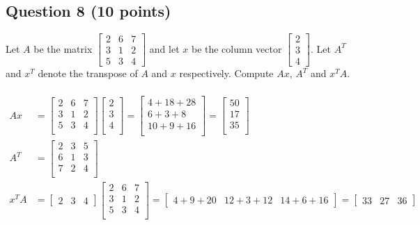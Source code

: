 \documentclass[12pt, border = 4pt, multi]{article} %
\begin{document}
\subsection*{Question 8 (10 points)}
Let $A$ be the matrix 
$\left[ \begin{array}{ccc}
     2 & 6 & 7 \\ 
     3 & 1 & 2 \\
     5 & 3 & 4 
    \end{array} 
\right]$
and let $x$ be the column vector
$\left[ \begin{array}{c}
     2 \\ 
     3 \\
     4  
    \end{array} 
\right]$. Let $A^{T}$ and $x^{T}$ denote the transpose of $A$ and $x$ respectively. Compute $Ax$, $A^{T}$ and $x^{T}A$.\\
\\
\begin{align*}
Ax &=
\begin{bmatrix}
2 & 6 & 7\\
3 & 1 & 2\\
5 & 3 & 4\\
\end{bmatrix}
\begin{bmatrix}
2\\
3\\
4\\
\end{bmatrix}
=
\begin{bmatrix}
4 + 18 + 28\\
6 + 3 + 8\\
10 + 9 + 16\\
\end{bmatrix}
=
\begin{bmatrix}
50\\
17\\
35\\
\end{bmatrix}\\
A ^ T &=
\begin{bmatrix}
2 & 3 & 5\\
6 & 1 & 3\\
7 & 2 & 4\\
\end{bmatrix}\\
x ^ T A &=
\begin{bmatrix}
2 & 3 & 4
\end{bmatrix}
\begin{bmatrix}
2 & 6 & 7\\
3 & 1 & 2\\
5 & 3 & 4\\
\end{bmatrix}
=
\begin{bmatrix}
4 + 9 + 20 & 12 + 3 + 12 & 14 + 6 + 16
\end{bmatrix}
=
\begin{bmatrix}
33 & 27 & 36
\end{bmatrix}
\end{align*}
\end{document}
